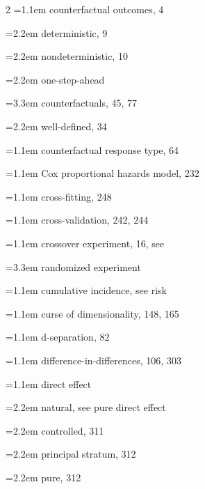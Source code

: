 \begin{multicols}{2}
\hangindent=1.1em counterfactual outcomes, 4\par
\hspace*{1.1em}\hangindent=2.2em deterministic, 9\par
\hspace*{1.1em}\hangindent=2.2em nondeterministic, 10\par
\hspace*{1.1em}\hangindent=2.2em one-step-ahead\par
\hspace*{2.2em}\hangindent=3.3em counterfactuals, 45, 77\par
\hspace*{1.1em}\hangindent=2.2em well-defined, 34\par
\hangindent=1.1em counterfactual response type, 64\par
\hangindent=1.1em Cox proportional hazards model, 232\par
\hangindent=1.1em cross-fitting, 248\par
\hangindent=1.1em cross-validation, 242, 244\par
\hangindent=1.1em crossover experiment, 16, see\par
\hspace*{2.2em}\hangindent=3.3em randomized experiment\par
\hangindent=1.1em cumulative incidence, see risk\par
\hangindent=1.1em curse of dimensionality, 148, 165\par
\hangindent=1.1em d-separation, 82\par
\hangindent=1.1em difference-in-differences, 106, 303\par
\hangindent=1.1em direct effect\par
\hspace*{1.1em}\hangindent=2.2em natural, see pure direct effect\par
\hspace*{1.1em}\hangindent=2.2em controlled, 311\par
\hspace*{1.1em}\hangindent=2.2em principal stratum, 312\par
\hspace*{1.1em}\hangindent=2.2em pure, 312\par

\end{multicols}

